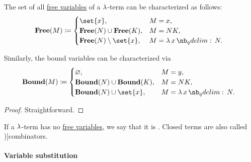 \begin{proposition}\label{thm:lambda_variable_freeness_characterization}
  The set of all \hyperref[def:lambda_variable_freeness]{free variables} of a \( \mathrm{\lambda} \)-term can be characterized as follows:
  \begin{equation*}
    \boldop{Free}(M) \coloneqq \begin{cases}
      \set{ x },                              &M = x, \\
      \boldop{Free}(N) \cup \boldop{Free}(K), &M = N K, \\
      \boldop{Free}(N) \setminus \set{ x },   &M = \qabs x N. \\
    \end{cases}
  \end{equation*}

  Similarly, the bound variables can be characterized via
  \begin{equation*}
    \boldop{Bound}(M) \coloneqq \begin{cases}
      \varnothing,                              &M = y, \\
      \boldop{Bound}(N) \cup \boldop{Bound}(K), &M = N K, \\
      \boldop{Bound}(N) \cup \set{ x },         &M = \qabs x N. \\
    \end{cases}
  \end{equation*}
\end{proposition}
\begin{proof}
  Straightforward.
\end{proof}

\begin{definition}\label{def:lambda_combinator}
  If a \( \mathrm{\lambda} \)-term has no \hyperref[def:lambda_variable_freeness]{free variables}, we say that it is . Closed terms are also called \term[ru=комбинаторы (\cite[188]{Герасимов2011})]{combinators}.
\end{definition}

\paragraph{Variable substitution}

